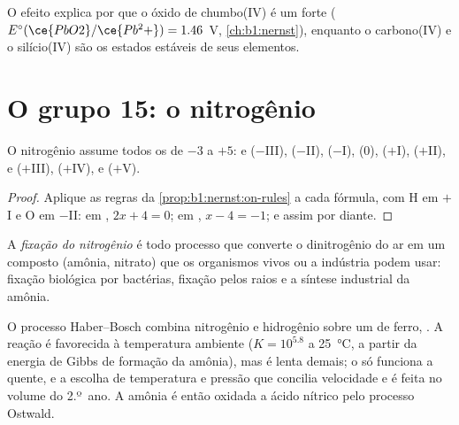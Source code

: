 O efeito explica por que o óxido de chumbo(IV) é um  forte
($E^\circ(\ce{PbO2}/\ce{Pb^2+}) = 1.46$~V, \cref{ch:b1:nernst}), enquanto
o carbono(IV) e o silício(IV) são os estados estáveis de seus elementos.

\section{O grupo 15: o nitrogênio}

\begin{proposition}\label{prop:b1:p-block-13-15:nitrogen-ladder}
O nitrogênio assume todos os  de $-3$ a $+5$:  e
 ($-$III),  ($-$II),  ($-$I),  (0),
 ($+$I),  ($+$II),  e  ($+$III),
 ($+$IV),  e  ($+$V).
\end{proposition}

\begin{proof}
Aplique as regras da \cref{prop:b1:nernst:on-rules} a cada fórmula, com H
em $+$I e O em $-$II: em , $2x + 4 = 0$; em , $x - 4 =
-1$; e assim por diante.
\end{proof}

\begin{definition}\label{def:b1:p-block-13-15:nitrogen-fixation}
A \emph{fixação do nitrogênio} é todo processo que
converte o dinitrogênio do ar em um composto (amônia, nitrato) que os
organismos vivos ou a indústria podem usar: fixação biológica por
bactérias, fixação pelos raios e a síntese industrial da amônia.
\end{definition}

O processo Haber--Bosch combina nitrogênio e hidrogênio sobre um
 de ferro, . A reação é favorecida à
temperatura ambiente ($K = 10^{5.8}$ a \qty{25}{\celsius}, a partir da
energia de Gibbs de formação da amônia), mas é lenta demais; o 
só funciona a quente, e a escolha de temperatura e pressão que concilia
velocidade e  é feita no volume do 2.º~ano. A amônia é então
oxidada a ácido nítrico pelo processo Ostwald.

